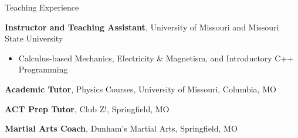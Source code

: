 \begin{rubric}{Teaching Experience}  

  \entry*[2018--2023]%
    \textbf{Instructor and Teaching Assistant}, University of Missouri and Missouri State University \RMPbadge\par
    \begin{itemize}
      \item Calculus-based Mechanics, Electricity \& Magnetism, and Introductory C++ Programming
    \end{itemize}

  \entry*[2021--Present]%
    \textbf{Academic Tutor}, Physics Courses, University of Missouri, Columbia, MO

  \entry*[2018--2021]%
    \textbf{ACT Prep Tutor}, Club Z!, Springfield, MO

  \entry*[2014--2020]%
    \textbf{Martial Arts Coach}, Dunham’s Martial Arts, Springfield, MO
\end{rubric}
